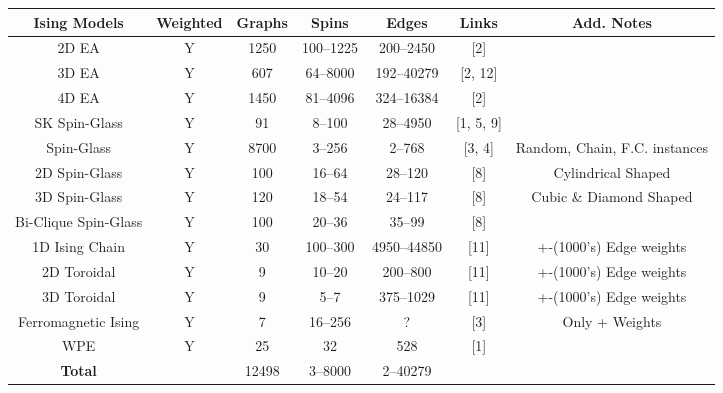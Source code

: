 \documentclass{standalone}
\begin{document}
\begin{tabular}{ |c|c|c|c|c|c|c| } 
    \hline
    \textbf{Ising Models} & \textbf{Weighted} & \textbf{Graphs} & \textbf{Spins} & \textbf{Edges} & \textbf{Links} & \textbf{Add. Notes}\\ 
    \hline
    2D EA & Y & 1250 & 100–1225 & 200–2450 & [2] & \\ 
    3D EA & Y & 607 & 64–8000 & 192–40279 & [2, 12] & \\ 
    4D EA & Y & 1450 & 81–4096 & 324–16384 & [2] & \\ 
    SK Spin-Glass & Y & 91 & 8–100 & 28–4950 & [1, 5, 9] & \\ 
    Spin-Glass & Y & 8700 & 3–256 & 2–768 & [3, 4] & Random, Chain, F.C. instances\\ 
    2D Spin-Glass & Y & 100 & 16–64 & 28–120 & [8] & Cylindrical Shaped\\ 
    3D Spin-Glass & Y & 120 & 18–54 & 24–117 & [8] & Cubic \& Diamond Shaped\\ 
    Bi-Clique Spin-Glass & Y & 100 & 20–36 & 35–99 & [8] & \\ 
    1D Ising Chain & Y & 30 & 100–300 & 4950–44850 & [11] & +-(1000's) Edge weights\\ 
    2D Toroidal & Y & 9 & 10–20 & 200–800 & [11] & +-(1000's) Edge weights\\ 
    3D Toroidal & Y & 9 & 5–7 & 375–1029 & [11] & +-(1000's) Edge weights\\ 
    Ferromagnetic Ising & Y & 7 & 16–256 & ? & [3] & Only + Weights\\ 
    WPE & Y & 25 & 32 & 528 & [1] &  \\ 
    \hline
    \textbf{Total} &  & 12498 & 3–8000 & 2–40279 & &\\
    \hline
\end{tabular}
\end{document}
